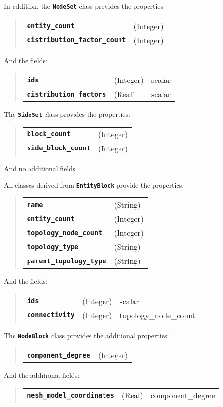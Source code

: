 \documentclass[11pt,twoside]{article}
\newcommand{\code}[1]
   {\mbox{\bf\tt #1}\null}
\begin{document}
In addition, the \code{NodeSet} class provides the properties:
\begin{quote}
\begin{tabular}{ll}
\code{entity\_count}         &(Integer) \\
\code{distribution\_factor\_count} &(Integer) \\
\end{tabular}
\end{quote}
And the fields:
\begin{quote}
\begin{tabular}{lll}
\code{ids}          & (Integer)  & scalar \\
\code{distribution\_factors} & (Real) & scalar \\
\end{tabular}
\end{quote}

The \code{SideSet} class provides the properties:
\begin{quote}
\begin{tabular}{ll}
\code{block\_count}         &(Integer) \\
\code{side\_block\_count} &(Integer) \\
\end{tabular}
\end{quote}
And no additional fields.

All classes derived from \code{EntityBlock} provide the properties:
\begin{quote}
\begin{tabular}{ll}
\code{name}                  &(String)  \\
\code{entity\_count}         &(Integer) \\
\code{topology\_node\_count} &(Integer) \\
\code{topology\_type}        &(String)  \\
\code{parent\_topology\_type}&(String)  \\
\end{tabular}
\end{quote}
And the fields:
\begin{quote}
\begin{tabular}{lll}
\code{ids}          & (Integer) & scalar \\
\code{connectivity} & (Integer) & topology\_node\_count \\
\end{tabular}
\end{quote}

The \code{NodeBlock} class provides the additional properties:
\begin{quote}
\begin{tabular}{ll}
\code{component\_degree}     &(Integer) \\
\end{tabular}
\end{quote}
And the additional fields:
\begin{quote}
\begin{tabular}{lll}
\code{mesh\_model\_coordinates}  & (Real) & component\_degree   \\
\end{tabular}
\end{quote}
\end{document}
